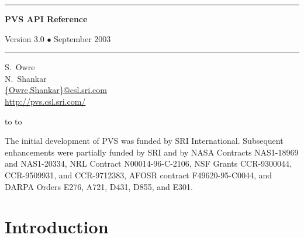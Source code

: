 \documentclass[12pt]{book}
\renewcommand{\topfraction}{.99}
\renewcommand{\bottomfraction}{.99}
\renewcommand{\textfraction}{.5}
\renewcommand{\floatpagefraction}{.1}
\begin{document}
\begin{titlepage}
\renewcommand{\thepage}{title}
\vspace*{1in}
\noindent
\rule[1pt]{\textwidth}{2pt}
\begin{center}
\textbf{\pvstitle PVS API Reference}
\end{center}
\begin{flushright}
{\Large Version 3.0 {\smaller$\bullet$} September 2003}
\end{flushright}
\rule[1in]{\textwidth}{2pt}
\vspace*{2in}
\begin{flushleft}
S.~Owre\\
N.~Shankar\\
{\smaller\url{{Owre,Shankar}@csl.sri.com}}\\
{\smaller\url{http://pvs.csl.sri.com/}}
\end{flushleft}
\vspace*{1in}
\vbox{\hbox to %
\hbox to }
\end{titlepage}

\pagestyle{fancy}
\renewcommand{\chaptermark}[1]{\markboth{{\em #1}}{}\markright{{\em #1}}}
\renewcommand{\sectionmark}[1]{\markright{\thesection \em \ #1}}
\lhead[\thepage]{\rightmark}
\rhead[\leftmark]{\thepage}
\thispagestyle{empty}

\newpage
\renewcommand{\thepage}{ack}
\vspace*{6in}\noindent
The initial development of PVS was funded by SRI International.
Subsequent enhancements were partially funded by SRI and by NASA
Contracts NAS1-18969 and NAS1-20334, NRL Contract N00014-96-C-2106,
NSF Grants CCR-9300044, CCR-9509931, and CCR-9712383, AFOSR contract
F49620-95-C0044, and DARPA Orders E276, A721, D431, D855, and E301.
\newpage
{}
\setcounter{page}{1}

\tableofcontents

\cleardoublepage
{}
\setcounter{page}{1}

\setcounter{topnumber}{9}
\renewcommand{\topfraction}{.99}
\setcounter{bottomnumber}{9}
\renewcommand{\bottomfraction}{.99}
\setcounter{totalnumber}{10}
\renewcommand{\textfraction}{.01}
\renewcommand{\floatpagefraction}{.01}

\chapter{Introduction}
\end{document}
